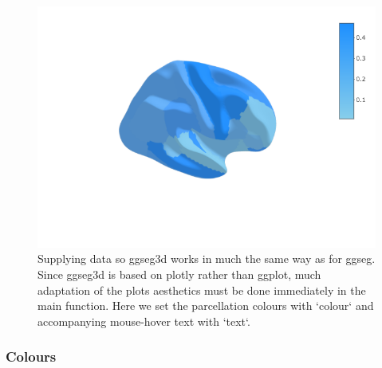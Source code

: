\documentclass[fleqn,10pt]{wlpeerj} %
\newenvironment{Shaded}{\begin{snugshade}}{\end{snugshade}}
\newcommand{\CommentTok}[1]{\textcolor[rgb]{0.56,0.35,0.01}{\textit{#1}}}
\newcommand{\DataTypeTok}[1]{\textcolor[rgb]{0.13,0.29,0.53}{#1}}
\newcommand{\DecValTok}[1]{\textcolor[rgb]{0.00,0.00,0.81}{#1}}
\newcommand{\KeywordTok}[1]{\textcolor[rgb]{0.13,0.29,0.53}{\textbf{#1}}}
\newcommand{\NormalTok}[1]{#1}
\newcommand{\OperatorTok}[1]{\textcolor[rgb]{0.81,0.36,0.00}{\textbf{#1}}}
\newcommand{\StringTok}[1]{\textcolor[rgb]{0.31,0.60,0.02}{#1}}
\begin{document}
\begin{Shaded}
\end{Shaded}

\begin{figure}
\includegraphics[width=0.6\linewidth]{png/ggseg3d_data} \caption{Supplying data so ggseg3d works in much the same way as for ggseg. Since ggseg3d is based on plotly rather than ggplot, much adaptation of the plots aesthetics must be done immediately in the main function. Here we set the parcellation colours with `colour` and accompanying mouse-hover text with `text`.}\label{fig:ggseg3d-data1}
\end{figure}

\hypertarget{colours}{%
\subsubsection{Colours}\label{colours}}
\end{document}
